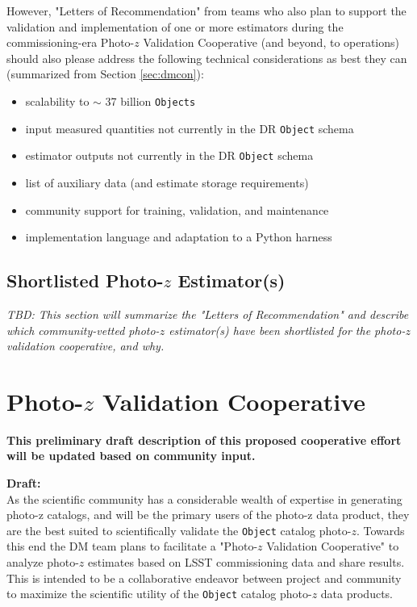\documentclass[DM,lsstdraft,toc]{lsstdoc}
\begin{document}
However, "Letters of Recommendation" from teams who also plan to support the validation and implementation of one or more estimators during the commissioning-era Photo-$z$ Validation Cooperative (and beyond, to operations) should also please address the following technical considerations as best they can (summarized from Section \ref{sec:dmcon}):

\begin{itemize}
\item scalability to $\sim$ 37 billion {\tt Objects}
\item input measured quantities not currently in the DR {\tt Object} schema
\item estimator outputs not currently in the DR {\tt Object} schema
\item list of auxiliary data (and estimate storage requirements)
\item community support for training, validation, and maintenance
\item implementation language and adaptation to a Python harness
\end{itemize}




\subsection{Shortlisted Photo-$z$ Estimator(s)} \label{ssec:lor_choice}

\textit{TBD: This section will summarize the "Letters of Recommendation" and describe which community-vetted photo-$z$ estimator(s) have been shortlisted for the photo-$z$ validation cooperative, and why.}

\section{Photo-$z$ Validation Cooperative}\label{sec:pzcoop}

\textbf{This preliminary draft description of this proposed cooperative effort will be updated based on community input.}

\textbf{Draft:} \\
As the scientific community has a considerable wealth of expertise in generating photo-z catalogs, and will be the primary users of the photo-z data product, they are the best suited to scientifically validate the {\tt Object} catalog photo-$z$.
Towards this end the DM team plans to facilitate a "Photo-$z$ Validation Cooperative" to analyze photo-$z$ estimates based on LSST commissioning data and share results.
This is intended to be a collaborative endeavor between project and community to maximize the scientific utility of the {\tt Object} catalog photo-$z$ data products.
\end{document}
